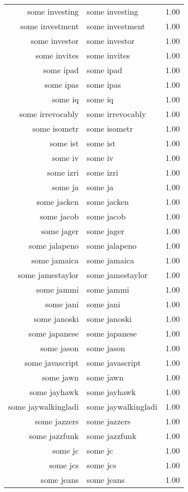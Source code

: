 \begin{table}[ht]
\begin{tabular}{rlr}
  some investing & some investing & 1.00 \\ 
  some investment & some investment & 1.00 \\ 
  some investor & some investor & 1.00 \\ 
  some invites & some invites & 1.00 \\ 
  some ipad & some ipad & 1.00 \\ 
  some ipas & some ipas & 1.00 \\ 
  some iq & some iq & 1.00 \\ 
  some irrevocably & some irrevocably & 1.00 \\ 
  some isometr & some isometr & 1.00 \\ 
  some ist & some ist & 1.00 \\ 
  some iv & some iv & 1.00 \\ 
  some izri & some izri & 1.00 \\ 
  some ja & some ja & 1.00 \\ 
  some jacken & some jacken & 1.00 \\ 
  some jacob & some jacob & 1.00 \\ 
  some jager & some jager & 1.00 \\ 
  some jalapeno & some jalapeno & 1.00 \\ 
  some jamaica & some jamaica & 1.00 \\ 
  some jamestaylor & some jamestaylor & 1.00 \\ 
  some jammi & some jammi & 1.00 \\ 
  some jani & some jani & 1.00 \\ 
  some janoski & some janoski & 1.00 \\ 
  some japanese & some japanese & 1.00 \\ 
  some jason & some jason & 1.00 \\ 
  some javascript & some javascript & 1.00 \\ 
  some jawn & some jawn & 1.00 \\ 
  some jayhawk & some jayhawk & 1.00 \\ 
  some jaywalkingladi & some jaywalkingladi & 1.00 \\ 
  some jazzers & some jazzers & 1.00 \\ 
  some jazzfunk & some jazzfunk & 1.00 \\ 
  some jc & some jc & 1.00 \\ 
  some jcs & some jcs & 1.00 \\ 
  some jeans & some jeans & 1.00 \\ 

\end{tabular}
\end{table}
